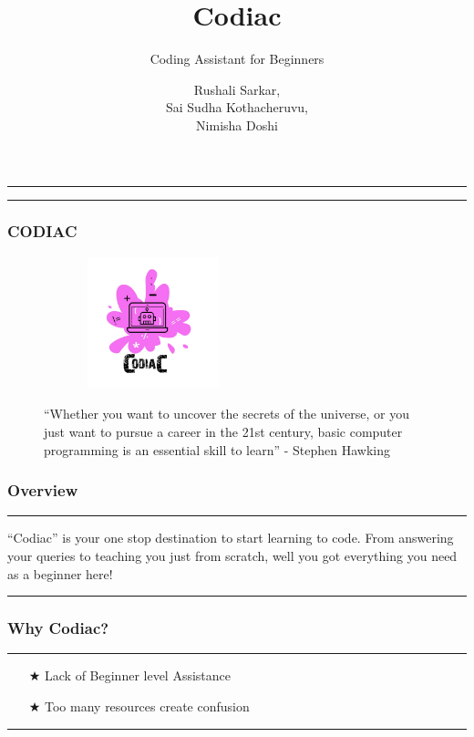 \documentclass[14pt]{beamer}
\title[Codiac]{Codiac}
\subtitle[Coding Assitant]{Coding Assistant for Beginners}
\author[Team 2]{Rushali Sarkar, \\ Sai Sudha Kothacheruvu, \\ Nimisha Doshi}
\begin{document}
\begin{frame}
    \noindent
    {\color{pink} \rule{\linewidth}{0.7mm} }
    \titlepage
    \noindent
    {\color{pink} \rule{\linewidth}{0.7mm} }
\end{frame}


\begin{frame}
    \frametitle{CODIAC}
    \begin{figure}[htbp]
        \centerline{\includegraphics[width=2.5in, height=1.5in]{./logos/logo.jpeg}}
        \begin{spacing}{0.25}
        {\small 
        ``Whether you want to uncover the secrets of the universe, 
        or you just want to pursue a career in the 21st century, 
        basic computer programming is an essential skill to learn'' 
        \linebreak - Stephen Hawking}
        \end{spacing}
    \end{figure}
\end{frame}


\begin{frame}
    \frametitle{Overview}
    \noindent
    {\color{pink} \rule{\linewidth}{0.7mm} }
    ``Codiac'' is your one stop destination to start learning to code. From answering your queries to teaching you just from scratch, well you got everything you need as a beginner here!
    \noindent
    {\color{pink} \rule{\linewidth}{0.7mm} }
\end{frame}

\begin{frame}
    \frametitle{Why Codiac?}
    \noindent
    {\color{pink} \rule{\linewidth}{0.7mm} }
    \begin{itemize}
    \item [$\bigstar$] Lack of Beginner level Assistance \\
        \pause
    \item [$\bigstar$] Too many resources create confusion\\
    \end{itemize}
    \noindent
     {\color{pink} \rule{\linewidth}{0.7mm}}
\end{frame}
\end{document}
